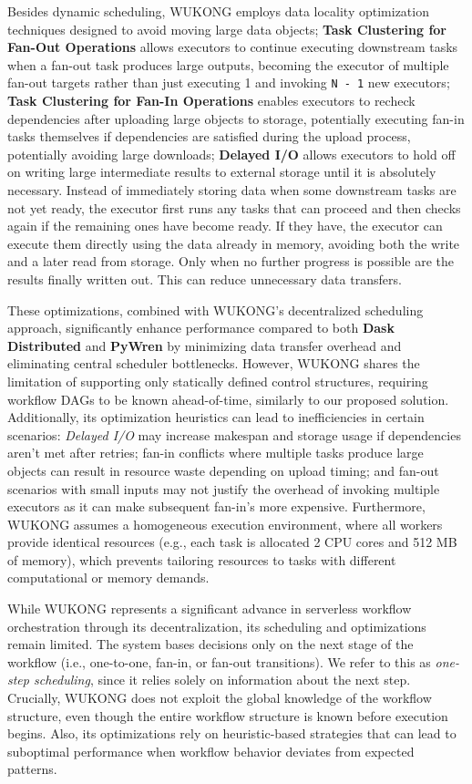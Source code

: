\begin{itemize}
Besides dynamic scheduling, WUKONG employs data locality optimization techniques designed to avoid moving large data objects; \textbf{Task Clustering for Fan-Out Operations} allows executors to continue executing downstream tasks when a fan-out task produces large outputs, becoming the executor of multiple fan-out targets rather than just executing 1 and invoking \texttt{N - 1} new executors; \textbf{Task Clustering for Fan-In Operations} enables executors to recheck dependencies after uploading large objects to storage, potentially executing fan-in tasks themselves if dependencies are satisfied during the upload process, potentially avoiding large downloads; \textbf{Delayed I/O} allows executors to hold off on writing large intermediate results to external storage until it is absolutely necessary. Instead of immediately storing data when some downstream tasks are not yet ready, the executor first runs any tasks that can proceed and then checks again if the remaining ones have become ready. If they have, the executor can execute them directly using the data already in memory, avoiding both the write and a later read from storage. Only when no further progress is possible are the results finally written out. This can reduce unnecessary data transfers.

These optimizations, combined with WUKONG's decentralized scheduling approach, significantly enhance performance compared to both \textbf{Dask Distributed} and \textbf{PyWren} by minimizing data transfer overhead and eliminating central scheduler bottlenecks. However, WUKONG shares the limitation of supporting only statically defined control structures, requiring workflow DAGs to be known ahead-of-time, similarly to our proposed solution. Additionally, its optimization heuristics can lead to inefficiencies in certain scenarios: \textit{Delayed I/O} may increase makespan and storage usage if dependencies aren't met after retries; fan-in conflicts where multiple tasks produce large objects can result in resource waste depending on upload timing; and fan-out scenarios with small inputs may not justify the overhead of invoking multiple executors as it can make subsequent fan-in's more expensive. Furthermore, WUKONG assumes a homogeneous execution environment, where all workers provide identical resources (e.g., each task is allocated 2 CPU cores and 512 MB of memory), which prevents tailoring resources to tasks with different computational or memory demands.

While WUKONG represents a significant advance in serverless workflow orchestration through its decentralization, its scheduling and optimizations remain limited. The system bases decisions only on the next stage of the workflow (i.e., one-to-one, fan-in, or fan-out transitions). We refer to this as \textit{one-step scheduling}, since it relies solely on information about the next step. Crucially, WUKONG does not exploit the global knowledge of the workflow structure, even though the entire workflow structure is known before execution begins. Also, its optimizations rely on heuristic-based strategies that can lead to suboptimal performance when workflow behavior deviates from expected patterns.


\end{itemize}
